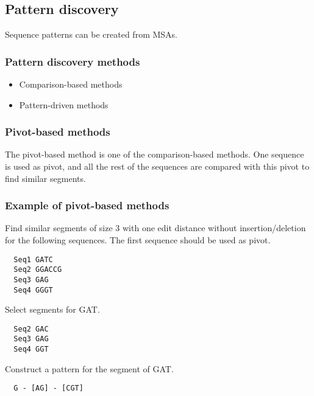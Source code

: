 %
%

%
%
\subsection{Pattern discovery}
Sequence patterns can be created from MSAs.

%
%
\subsubsection*{Pattern discovery methods}
\begin{itemize}
\item Comparison-based methods
\item Pattern-driven methods
\end{itemize}

%
%
\subsubsection*{Pivot-based methods}
The pivot-based method is one of the comparison-based methods.  One sequence is used as pivot, and all the rest of the sequences are compared with this pivot to find similar segments.

%
%
\subsubsection*{Example of pivot-based methods}
Find similar segments of size 3 with one edit distance without insertion/deletion for the following sequences. The first sequence should be used as pivot.

\begin{verbatim}
  Seq1 GATC
  Seq2 GGACCG
  Seq3 GAG
  Seq4 GGGT
\end{verbatim}

\noindent
Select segments for GAT.
\begin{verbatim}
  Seq2 GAC
  Seq3 GAG
  Seq4 GGT
\end{verbatim}

\noindent
Construct a pattern for the segment of GAT.
\begin{verbatim}
  G - [AG] - [CGT]
\end{verbatim}

